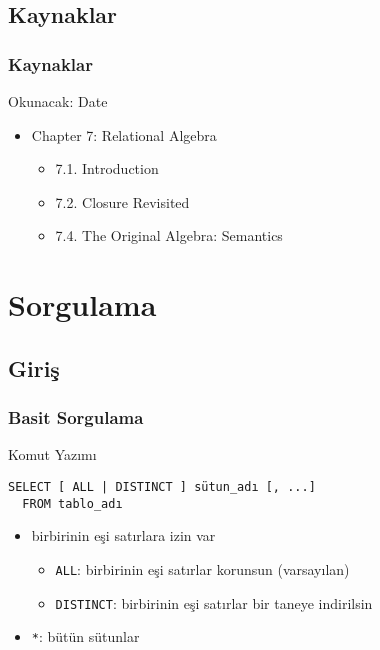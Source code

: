 \documentclass[dvipsnames]{beamer}
\theoremstyle{definition}
\theoremstyle{example}
\theoremstyle{plain}
\begin{document}
\subsection*{Kaynaklar}

\begin{frame}
  \frametitle{Kaynaklar}

  \begin{block}{Okunacak: Date}
    \begin{itemize}
      \item Chapter 7: Relational Algebra
      \begin{itemize}
        \item 7.1. \alert{Introduction}
        \item 7.2. \alert{Closure Revisited}
        \item 7.4. \alert{The Original Algebra: Semantics}
      \end{itemize}
    \end{itemize}
  \end{block}
\end{frame}

\lstset{language=FullSQL}

\section{Sorgulama}

\subsection{Giriş}

\begin{frame}[fragile]
  \frametitle{Basit Sorgulama}

  \begin{block}{Komut Yazımı}
    \begin{lstlisting}
SELECT [ ALL | DISTINCT ] sütun_adı [, ...]
  FROM tablo_adı
    \end{lstlisting}
  \end{block}

  \pause
  \begin{itemize}
    \item birbirinin eşi satırlara izin var
    \begin{itemize}
        \item \lstinline!ALL!: birbirinin eşi satırlar korunsun (varsayılan)
        \item \lstinline!DISTINCT!: birbirinin eşi satırlar bir taneye
          indirilsin
    \end{itemize}

    \item \lstinline!*!: bütün sütunlar
  \end{itemize}
\end{frame}
\end{document}
